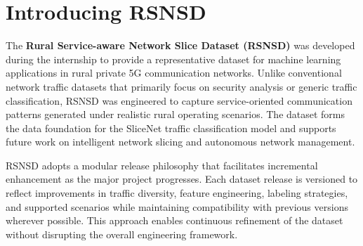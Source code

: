 \documentclass[12pt,a4paper]{report}
\begin{document}
	\section{Introducing RSNSD}
	\label{sec:rsnsd}
	
	The \textbf{Rural Service-aware Network Slice Dataset (RSNSD)} was developed during the internship to provide a representative dataset for machine learning applications in rural private 5G communication networks. Unlike conventional network traffic datasets that primarily focus on security analysis or generic traffic classification, RSNSD was engineered to capture service-oriented communication patterns generated under realistic rural operating scenarios. The dataset forms the data foundation for the SliceNet traffic classification model and supports future work on intelligent network slicing and autonomous network management.
	
	RSNSD adopts a modular release philosophy that facilitates incremental enhancement as the major project progresses. Each dataset release is versioned to reflect improvements in traffic diversity, feature engineering, labeling strategies, and supported scenarios while maintaining compatibility with previous versions wherever possible. This approach enables continuous refinement of the dataset without disrupting the overall engineering framework.
	
\end{document}
